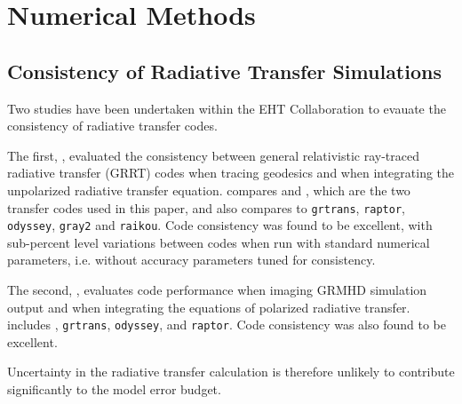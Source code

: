 \section{Numerical Methods}\label{app:numerical}

\subsection{Consistency of Radiative Transfer Simulations}\label{app:radtrans}


Two studies have been undertaken within the EHT Collaboration to evauate the consistency of radiative transfer codes. 

The first, \citet{2020ApJ...897..148G}, evaluated the consistency between general relativistic ray-traced radiative transfer (GRRT) codes when tracing geodesics and when integrating the unpolarized radiative transfer equation.  \citeauthor{2020ApJ...897..148G} compares \bhoss and \ipole, which are the two transfer codes used in this paper, and  also compares to {\tt grtrans}, {\tt raptor}, {\tt odyssey}, {\tt gray2} and {\tt raikou}.  Code consistency was found to be excellent, with sub-percent level variations between codes when run with standard numerical parameters, i.e. without accuracy parameters tuned for consistency.

The second, \citet{Prather_et_al_2022}, evaluates code performance when imaging GRMHD simulation output and when integrating the equations of polarized radiative transfer.  \citeauthor{Prather_et_al_2022} includes \ipole, {\tt grtrans}, {\tt odyssey}, and {\tt raptor}.  Code consistency was also found to be excellent.

Uncertainty in the radiative transfer calculation is therefore unlikely to contribute significantly to the model error budget.  


